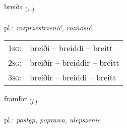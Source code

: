 \documentclass[frontgrid, backgrid]{flacards}\usepackage[]{graphicx}\usepackage[]{xcolor}
\begin{document}
\renewcommand{\flhead}{\vskip5pt \fboxsep=0pt {\small\bfseries\footnotesize Sagnorð | Verb}}
\renewcommand{\fcfoot}{\vskip5pt \fboxsep=0pt \hspace{2pt}{\small\bfseries\footnotesize 2K}}

\renewcommand{\blhead}{\vskip5pt {\small\bfseries\footnotesize Sagnorð | Verb }}
\renewcommand{\bcfoot}{\vskip5pt \hspace{2pt}{\small\bfseries\footnotesize 2K}}


{breiða \small{\textsubscript{(\textit{v.})}} \\[1ex] %
\textphonetic{[preiːða]} \\
pl.: \emph{rozprzestrzenić,  roznosić} \\  [2ex]
\renewcommand*{\arraystretch}{0.8}
\begin{tabular}{p{1cm}l}
\textsc{1sg}: & breiði -- breiddi -- breitt \\ 
\textsc{2sg}: & breiðir -- breiddir -- breitt \\ 
\textsc{3sg}: & breiðir -- breiddi -- breitt \\ 
\end{tabular}
}

\renewcommand{\flhead}{\vskip5pt \fboxsep=0pt {\small\bfseries\footnotesize Nafnorð | Noun}}
\renewcommand{\fcfoot}{\vskip5pt \fboxsep=0pt \hspace{2pt}{\small\bfseries\footnotesize 2K}}

\renewcommand{\blhead}{\vskip5pt {\small\bfseries\footnotesize Nafnorð | Noun }}
\renewcommand{\bcfoot}{\vskip5pt \hspace{2pt}{\small\bfseries\footnotesize 2K}}


{framför \small{\textsubscript{(\textit{f.})}} \\[1ex] %
\textphonetic{[framfœr]} \\
pl.: \emph{postęp, poprawa,  ulepszenie} \\  [2ex]
\renewcommand*{\arraystretch}{0.8}
}
\end{document}
